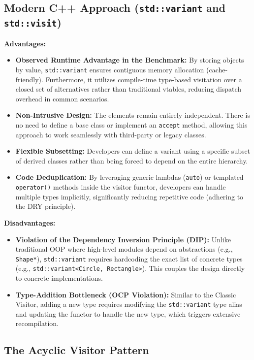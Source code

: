 \subsection{Modern C++ Approach (\texttt{std::variant} and \texttt{std::visit})}

\textbf{Advantages:}
\begin{itemize}
    \item \textbf{Observed Runtime Advantage in the Benchmark:} By storing objects by value, \texttt{std::variant} ensures contiguous memory allocation (cache-friendly). Furthermore, it utilizes compile-time type-based visitation over a closed set of alternatives rather than traditional vtables, reducing dispatch overhead in common scenarios.
    \item \textbf{Non-Intrusive Design:} The elements remain entirely independent. There is no need to define a base class or implement an \texttt{accept} method, allowing this approach to work seamlessly with third-party or legacy classes.
    \item \textbf{Flexible Subsetting:} Developers can define a variant using a specific subset of derived classes rather than being forced to depend on the entire hierarchy.
    \item \textbf{Code Deduplication:} By leveraging generic lambdas (\texttt{auto}) or templated \texttt{operator()} methods inside the visitor functor, developers can handle multiple types implicitly, significantly reducing repetitive code (adhering to the DRY principle).
\end{itemize}

\textbf{Disadvantages:}
\begin{itemize}
    \item \textbf{Violation of the Dependency Inversion Principle (DIP):} Unlike traditional OOP where high-level modules depend on abstractions (e.g., \texttt{Shape*}), \texttt{std::variant} requires hardcoding the exact list of concrete types (e.g., \texttt{std::variant<Circle, Rectangle>}). This couples the design directly to concrete implementations.
    \item \textbf{Type-Addition Bottleneck (OCP Violation):} Similar to the Classic Visitor, adding a new type requires modifying the \texttt{std::variant} type alias and updating the functor to handle the new type, which triggers extensive recompilation.
\end{itemize}


\subsection{The Acyclic Visitor Pattern}

